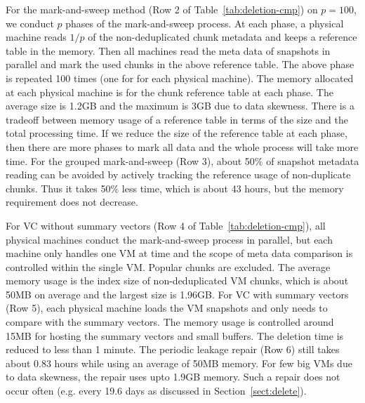 For the mark-and-sweep method (Row 2 of Table~\ref{tab:deletion-cmp}) 
on $p=100$, we conduct $p$ phases of the mark-and-sweep process.
At each phase, a physical machine 
reads $1/p$ of the non-deduplicated chunk metadata
and keeps a reference table in the memory.
Then all machines read the meta data 
of snapshots in parallel and mark the used chunks
in the above reference table.
The above phase is repeated 100 times (one for for each physical machine).
The memory allocated at each physical machine is for the 
chunk reference table at each phase. The average size is 1.2GB and the maximum is
3GB due to data skewness.  
There is a tradeoff between memory usage of a reference table in terms of the size
and the total processing time. If we reduce the size of  the reference table at each phase, 
then there are more phases to mark all data and the whole process  will take more time.
For the grouped mark-and-sweep (Row 3), about 50\% of snapshot metadata reading can be 
avoided by actively tracking the reference usage of non-duplicate chunks. 
Thus it takes 50\% less time, which is about 43 hours, but the 
memory requirement does not decrease.

For VC without summary vectors (Row 4 of Table~\ref{tab:deletion-cmp}), 
all physical machines conduct the mark-and-sweep process in parallel, 
but each machine only handles one VM at time and 
the scope of meta data comparison is controlled within the single VM.
Popular chunks are excluded. The average memory usage is the index size of 
non-deduplicated VM chunks, which is about 50MB on average and the largest
size is 1.96GB. 
For VC with summary vectors (Row 5), each physical machine loads
the VM snapshots and only needs to compare with the summary vectors.
The memory usage is controlled around 15MB for hosting the summary vectors
and small buffers. The deletion time is reduced to less than 1 minute.
The periodic leakage repair (Row 6) still takes about 0.83 hours while using
an average of 50MB memory. For  few big VMs due to data skewness, the repair uses upto 1.9GB memory.
Such a repair does not occur often (e.g. every 19.6 days as discussed in Section~\ref{sect:delete}). 



